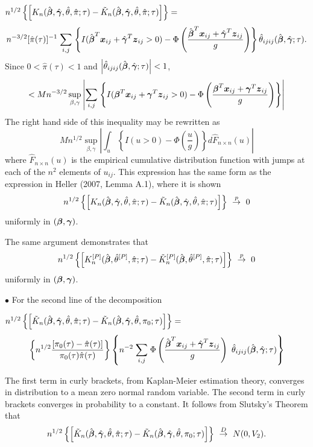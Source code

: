 \documentclass[12pt]{article}
\newcommand{\bmx}{\mbox{\boldmath $x$}}
\newcommand{\bg}{\mbox{\boldmath $\gamma$}}
\newcommand{\bb}{\mbox{\boldmath $\beta$}}
\newcommand{\bmz}{\mbox{\boldmath $z$}}
\def\stackunder#1#2{\mathrel{\mathop{#2}\limits_{#1}}}
\begin{document}
\noindent $n^{1/2} \left\{ \left[K_n(\hat{\bb},\hat{\bg}, \hat{\theta},\hat{\pi};\tau) - \tilde{K}_n(\hat{\bb},\hat{\bg}, \hat{\theta},\hat{\pi};\tau) \right] \right\} = $ 
\small
\[ n^{-3/2} [\hat{\pi}(\tau)]^{-1} \stackunder{i, j}{\sum} \left\{ I(\hat{\bb}^T\bmx_{ij} + \hat{\bg}^T\bmz_{ij} > 0) - \Phi \left(\frac{\hat{\bb}^T\bmx_{ij} + \hat{\bg}^T\bmz_{ij}}{g} \right) \right\} \hat{\theta}_{ijij}(\hat{\bb},\hat{\bg};\tau) .\]
\normalsize
Since $0 < \hat{\pi}(\tau) < 1$ and $\left| \hat{\theta}_{ijij}(\hat{\bb},\hat{\bg};\tau) \right| < 1$,
\[ < M n^{-3/2} \sup_{\beta, \gamma}  \left|\stackunder{i, j}{\sum} \left\{ I(\bb^T\bmx_{ij} + \bg^T\bmz_{ij} > 0) - \Phi \left(\frac{\bb^T\bmx_{ij} + \bg^T\bmz_{ij}}{g} \right) \right\} \right| \]
The right hand side of this inequality may be rewritten as
\[ M n^{1/2} \sup_{\beta, \gamma} \left| \int_u \left\{ I(u > 0) - \Phi \left(\frac{u}{g} \right) \right\} d\hat{F}_{n \times n}(u) \right| \]
where $\hat{F}_{n \times n}(u)$ is the empirical cumulative distribution function with jumps at each of the $n^2$ elements of $u_{ij}$. This expression has the same form as the expression in Heller (2007, Lemma A.1), where it is shown 
\[ n^{1/2} \left\{ \left[K_n(\hat{\bb},\hat{\bg}, \hat{\theta},\hat{\pi};\tau) - \tilde{K}_n(\hat{\bb},\hat{\bg}, \hat{\theta},\hat{\pi};\tau) \right] \right\}  \ \stackrel{p}{\rightarrow} \ 0  \]
uniformly in $(\bb, \bg)$.
	
\noindent The same argument demonstrates that	
\[ n^{1/2} \left\{ \left[K_n^{[P]}(\hat{\bb}, \hat{\theta}^{[P]},\hat{\pi};\tau) - \tilde{K}_n^{[P]}(\hat{\bb}, \hat{\theta}^{[P]},\hat{\pi};\tau) \right] \right\} \ \stackrel{p}{\rightarrow} \ 0 \]
uniformly in $(\bb, \bg)$.

\vskip 0.25in

\noindent $\bullet$   For the second line of the decomposition

\noindent $n^{1/2} \left\{ \left[\tilde{K}_n(\hat{\bb},\hat{\bg}, \hat{\theta},\hat{\pi};\tau) - \tilde{K}_n(\hat{\bb},\hat{\bg}, \hat{\theta},\pi_0;\tau) \right] \right\} =$
\[ \left\{ n^{1/2} \frac{[\pi_0(\tau)-\hat{\pi}(\tau)]}{\pi_0(\tau) \hat{\pi}(\tau)} \right\} \left\{ n^{-2} \stackunder{i, j }{\sum } \Phi \left(\frac{\hat{\bb}^T\bmx_{ij} + \hat{\bg}^T\bmz_{ij}}{g} \right)  \ \hat{\theta}_{ijij}(\hat{\bb},\hat{\bg};\tau) \right\} \]

\noindent The first term in curly brackets, from Kaplan-Meier estimation theory, converges in distribution to a mean zero normal random variable.  The second term in curly brackets converges in probability to a constant. It follows from Slutsky's Theorem that 
\[ n^{1/2} \left\{ \left[\tilde{K}_n(\hat{\bb},\hat{\bg}, \hat{\theta},\hat{\pi};\tau) - \tilde{K}_n(\hat{\bb},\hat{\bg}, \hat{\theta},\pi_0;\tau) \right] \right\}\ \stackrel{D}{\rightarrow} \ N(0, V_{2}) .\]
\end{document}
